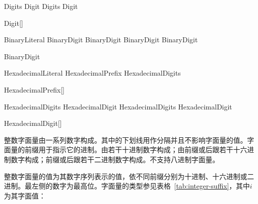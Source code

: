 \begin{bnf}{Digits}
    Digit \br
    Digits \terminal{_}\bnfq Digit
\end{bnf}

\begin{bnf}{Digit}[\oneof]
\end{bnf}

\begin{bnf}{BinaryLiteral}
     BinaryDigit \bnflp\terminal{_}\bnfq BinaryDigit\bnfrp\bnfs \br
     BinaryDigit \bnflp\terminal{_}\bnfq BinaryDigit\bnfrp\bnfs
\end{bnf}

\begin{bnf}{BinaryDigit}
     \br
\end{bnf}

\begin{bnf}{HexadecimalLiteral}
    HexadecimalPrefix HexadecimalDigits
\end{bnf}

\begin{bnf}{HexadecimalPrefix}[\oneof]
\end{bnf}

\begin{bnf}{HexadecimalDigits}
    HexadecimalDigit \br
    HexadecimalDigits \terminal{_}\bnfs HexadecimalDigit
\end{bnf}

\begin{bnf}{HexadecimalDigit}[\oneof]
     \br
     \br
\end{bnf}

\pnum
整数字面量由一系列数字构成。其中的下划线用作分隔并且不影响字面量的值。字面量的前缀用于指示它的进制。由若干十进制数字构成；由前缀或后跟若干十六进制数字构成；前缀或后跟若干二进制数字构成。\X 不支持八进制字面量。

\pnum
整数字面量的值为其数字序列表示的值，依不同前缀分别为十进制、十六进制或二进制。最左侧的数字为最高位。字面量的类型参见表格~\ref{tab:integer-suffix}，其中$i$为其字面值：

